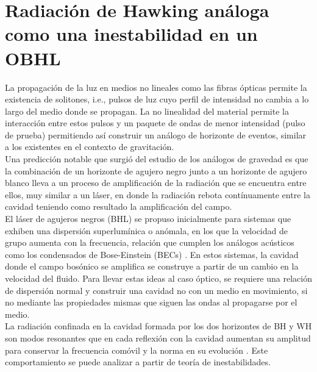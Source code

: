 \chapter[Inestabilidades en un OBHL]{Radiaci\'{o}n de Hawking an\'{a}loga como una inestabilidad en un OBHL}\label{cap5}

La propagaci\'{o}n de la luz en medios no lineales como las fibras \'{o}pticas permite la existencia de solitones, i.e., pulsos de luz cuyo perfil de intensidad no cambia a lo largo del medio donde se propagan. La no linealidad del material permite la interacción entre estos pulsos y un paquete de ondas de menor intensidad (pulso de prueba) permitiendo as\'{i} construir un análogo de horizonte de eventos, similar a los existentes en el contexto de gravitaci\'{o}n.\\

Una predicción notable que surgió del estudio de los an\'{a}logos de gravedad  es que la combinación de un  horizonte de agujero negro junto a un horizonte de agujero blanco lleva a un proceso de amplificación de la radiaci\'{o}n que se encuentra entre ellos, muy similar a un láser, en donde la radiación rebota cont\'{i}nuamente entre la cavidad teniendo como resultado la amplificaci\'{o}n del campo.\\

El láser de agujeros negros (BHL) se propuso inicialmente para sistemas que exhiben una dispersión superlum\'{i}nica o an\'{o}mala, en los que la velocidad de grupo aumenta con la frecuencia, relaci\'{o}n que cumplen los an\'{a}logos ac\'{u}sticos como los condensados de Bose-Einstein (BECs) \citep{Corley1999}. En estos sistemas, la cavidad donde el campo bos\'{o}nico se amplifica se construye a partir de un cambio en la velocidad del fluido. Para llevar estas ideas al caso \'{o}ptico, se requiere una relaci\'{o}n de dispersi\'{o}n normal \citep{GaonaReyes2017} y construir una cavidad no con un medio en movimiento, si no mediante las propiedades mismas que siguen las ondas al propagarse por el medio.\\

La radiaci\'{o}n confinada en la cavidad formada por los dos horizontes de BH y WH son modos resonantes que en cada reflexi\'on con la cavidad aumentan su amplitud para conservar la frecuencia com\'{o}vil y la norma en su evoluci\'{o}n \citep{Robertson2011}. Este comportamiento se puede analizar a partir de teor\'{i}a de inestabilidades.\\

